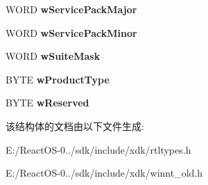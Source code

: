 \begin{DoxyCompactItemize}
W\+O\+RD {\bfseries w\+Service\+Pack\+Major}
\item 
\mbox{\label{struct___o_s_v_e_r_s_i_o_n_i_n_f_o_e_x_a_ad7143cd9f78810173d053818e3708480}} 
W\+O\+RD {\bfseries w\+Service\+Pack\+Minor}
\item 
\mbox{\label{struct___o_s_v_e_r_s_i_o_n_i_n_f_o_e_x_a_aead11e747e2e3bad740ab12e081fd721}} 
W\+O\+RD {\bfseries w\+Suite\+Mask}
\item 
\mbox{\label{struct___o_s_v_e_r_s_i_o_n_i_n_f_o_e_x_a_a56d7178941d4892eba4dddd93d7656f3}} 
B\+Y\+TE {\bfseries w\+Product\+Type}
\item 
\mbox{\label{struct___o_s_v_e_r_s_i_o_n_i_n_f_o_e_x_a_ae673e02e0d083b16f04eec97f41c65b3}} 
B\+Y\+TE {\bfseries w\+Reserved}
\end{DoxyCompactItemize}


该结构体的文档由以下文件生成\+:\begin{DoxyCompactItemize}
\item 
E\+:/\+React\+O\+S-\/0../sdk/include/xdk/rtltypes.\+h\item 
E\+:/\+React\+O\+S-\/0../sdk/include/xdk/winnt\+\_\+old.\+h\end{DoxyCompactItemize}
